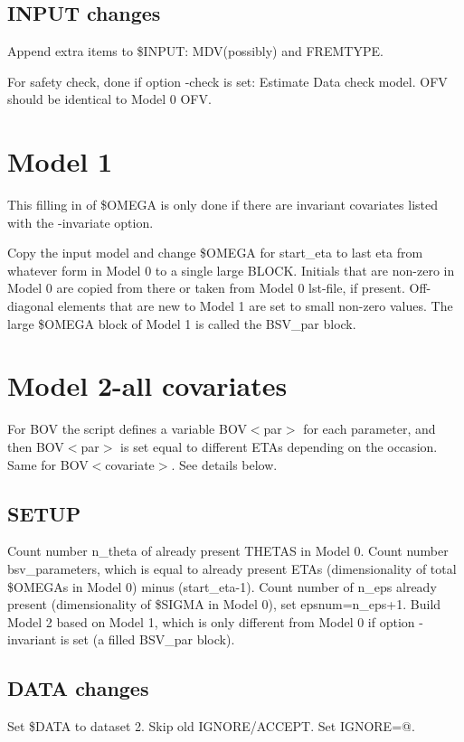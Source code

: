 \subsection{INPUT changes}
Append extra items to \$INPUT: MDV(possibly) and FREMTYPE.

For safety check, done if option -check is set: Estimate Data check model. OFV should be identical to Model 0 OFV.

\section{Model 1}
This filling in of \$OMEGA is only done if there are invariant covariates listed with the -invariate option.

Copy the input model and change \$OMEGA for start\_eta to last eta from whatever form in Model 0 to a single large BLOCK. 
Initials that are non-zero in Model 0 are copied from there or taken from Model 0 lst-file, if present. 
Off-diagonal elements that are new to Model 1 are set to small non-zero values.
The large \$OMEGA block of Model 1 is called the BSV\_par block.

\section{Model 2-all covariates}

For BOV the script defines a variable BOV$<$par$>$ for each parameter, and then BOV$<$par$>$ is set equal to different ETAs depending on the occasion. Same for BOV$<$covariate$>$. See details below. 

\subsection{SETUP}
Count number n\_theta of already present THETAS in Model 0. Count number bsv\_parameters, which is
equal to already present ETAs 
(dimensionality of total \$OMEGAs in Model 0) minus (start\_eta-1). 
Count number of n\_eps already present (dimensionality of \$SIGMA in Model 0), set epsnum=n\_eps+1.
Build Model 2 based on Model 1, which is only different from Model 0 if option -invariant is set (a filled BSV\_par block).

\subsection{DATA changes}
Set \$DATA to dataset 2. Skip old IGNORE/ACCEPT. Set IGNORE=@.

